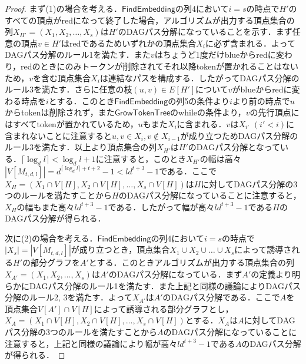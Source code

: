 \documentclass[master]{kuisthesis}		%
\theoremstyle{plain}
\theoremstyle{definition}
\begin{document}
\begin{proof}
まず(1)の場合を考える．$\mathsf{FindEmbedding}$の列4において$i=s$の時点で$H'$のすべての頂点がredになって終了した場合，アルゴリズムが出力する頂点集合の列$X_{H'} = (X_1, X_2, \dots , X_s)$は$H'$のDAGパス分解になっていることを示す．まず任意の頂点$v \in H'$はredであるためいずれかの頂点集合$X_i$に必ず含まれる．よってDAGパス分解のルール1を満たす．また$v$はちょうど1度だけblueからredに変わり，redのときにのみトークンが削除されてそれ以降tokenが置かれることはないため，$v$を含む頂点集合$X_i$は連結なパスを構成する．したがってDAGパス分解のルール3を満たす．さらに任意の枝$(u, v) \in E[H']$について$v$がblueからredに変わる時点を$i$とする．このとき$\mathsf{FindEmbedding}$の列5の条件より$i$より前の時点で$u$からtokenは削除されず，また$\mathsf{GrowTokenTree}$のwhileの条件より，$v$の先行頂点にはすべてtokenが置かれているため，$u$もまた$X_i$に含まれる．$v$は$X_{i'}$ $(i' < i)$に含まれないことに注意すると$u, v \in X_i, v \notin X_{i-1}$が成り立つためDAGパス分解のルール3を満たす．以上より頂点集合の列$X_{H'}$は$H'$のDAGパス分解となっている．$\lceil \log_d l \rceil < \log_d l +1$に注意すると，このとき$X_{H'}$の幅は高々$|V[M_{t, d, l}]| = d^{\lceil \log_d l \rceil +t+2}-1 < ld^{t+3}-1$である．ここで$X_H = (X_1 \cap V[H], X_2 \cap V[H], \dots , X_s \cap V[H])$は$H$に対してDAGパス分解の3つのルールを満たすことから$H$のDAGパス分解になっていることに注意すると，$X_H$の幅もまた高々$ld^{t+3}-1$である．したがって幅が高々$ld^{t+3}-1$である$H$のDAGパス分解が得られる．

次に(2)の場合を考える．$\mathsf{FindEmbedding}$の列4において$i=s$の時点で$|X_s| = |V[M_{t, d, l}]|$が成り立つとき，頂点集合$X_1 \cup X_2 \cup \dots \cup X_s$によって誘導される$H'$の部分グラフを$A'$とする．このときアルゴリズムが出力する頂点集合の列$X_{A'} = (X_1, X_2, \dots , X_s)$は$A'$のDAGパス分解になっている．まず$A'$の定義より明らかにDAGパス分解のルール1を満たす．また上記と同様の議論によりDAGパス分解のルール2, 3を満たす．よって$X_{A'}$は$A'$のDAGパス分解である．ここで$A$を頂点集合$V[A'] \cap V[H]$によって誘導される部分グラフとし，$X_A = (X_1 \cap V[H], X_2 \cap V[H], \dots , X_s \cap V[H])$とする．$X_A$は$A$に対してDAGパス分解の3つのルールを満たすことから$A$のDAGパス分解になっていることに注意すると，上記と同様の議論により幅が高々$ld^{t+3}-1$である$A$のDAGパス分解が得られる．


\end{proof}
\end{document}
